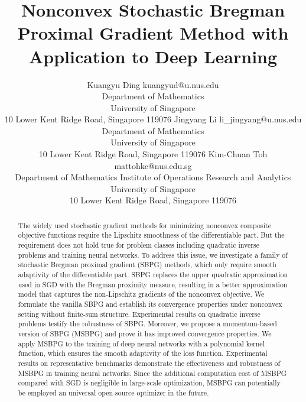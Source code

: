 \documentclass[twoside,11pt]{article}
\begin{document}
\title{Nonconvex Stochastic Bregman Proximal Gradient Method with Application to Deep Learning}

\author{\name Kuangyu Ding \email  kuangyud@u.nus.edu \\
       \addr Department of Mathematics\\
       University of Singapore\\
       10 Lower Kent Ridge Road, Singapore 119076
       \AND
       \name Jingyang Li \email  li\_jingyang@u.nus.edu \\
       \addr Department of Mathematics\\
       University of Singapore\\
       10 Lower Kent Ridge Road, Singapore 119076
       \AND
       \name Kim-Chuan Toh \email  mattohkc@nus.edu.sg \\
       \addr Department of Mathematics Institute of Operations Research and Analytics\\
       University of Singapore\\
       10 Lower Kent Ridge Road, Singapore 119076}


\editor{}


\maketitle

\begin{abstract}%
{The widely used stochastic gradient methods for minimizing nonconvex composite objective functions require the Lipschitz smoothness of the differentiable part. But the requirement} does not hold true for problem classes including quadratic inverse problems and training neural networks. 
To address this issue, we investigate a family of stochastic Bregman proximal gradient (SBPG) methods, which only require smooth adaptivity of the differentiable part. SBPG replaces the upper quadratic approximation used in SGD with the Bregman proximity measure, resulting in a better approximation model that captures the non-Lipschitz gradients of the nonconvex objective. We formulate the vanilla SBPG and establish its convergence properties under nonconvex setting without finite-sum structure. Experimental results on quadratic inverse problems testify the robustness of SBPG. Moreover, we propose a momentum-based version of SBPG (MSBPG) and prove it has improved convergence properties. We apply MSBPG to the training of deep neural networks with a polynomial kernel function, which ensures the smooth adaptivity of the loss function. Experimental results on representative benchmarks demonstrate the effectiveness and robustness of MSBPG in training neural networks. Since the additional computation cost of MSBPG compared with SGD is negligible in large-scale optimization, {
MSBPG can potentially be employed an universal open-source optimizer in the future.}
\end{abstract}
\end{document}
